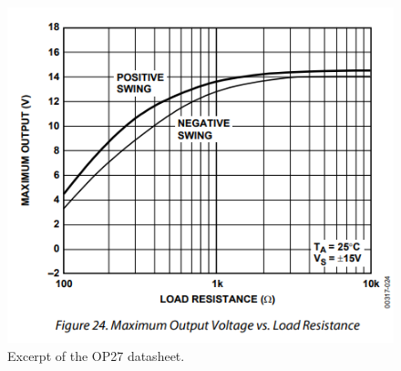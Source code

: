 \documentclass{report}
\begin{document}
\begin{figure}
	\centering
	\includegraphics[width=0.7\linewidth]{op27fig24}
	\caption{Excerpt of the OP27 datasheet.}
	\label{fig:op27fig24}
\end{figure}
\end{document}
